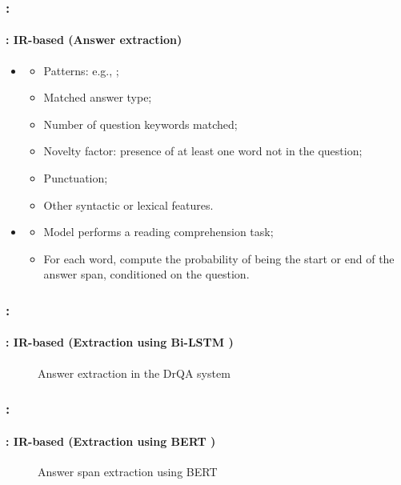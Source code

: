 \documentclass[xcolor=table]{beamer}
\begin{document}
\begin{frame}
	\frametitle{\insertshortsubtitle: \insertsection}
	\framesubtitle{\insertsubsection: IR-based (Answer extraction)}
	
	\begin{itemize}
		\item {}
		\begin{itemize}
			\item Patterns: e.g., ;
			\item Matched answer type;
			\item Number of question keywords matched;
			\item Novelty factor: presence of at least one word not in the question;
			\item Punctuation;
			\item Other syntactic or lexical features.
		\end{itemize}
		\item {}
		\begin{itemize}
			\item Model performs a reading comprehension task;
			\item For each word, compute the probability of being the start or end of the answer span, conditioned on the question.
		\end{itemize}
	\end{itemize}
	
\end{frame}

\begin{frame}
	\frametitle{\insertshortsubtitle: \insertsection}
	\framesubtitle{\insertsubsection: IR-based (Extraction using Bi-LSTM \cite{2017-chen-al})}
	
	\vskip-6pt
	\begin{figure}
		\vskip-3pt
		\caption{Answer extraction in the DrQA system \cite{2019-jurafsky-martin}}
	\end{figure}
	
\end{frame}

\begin{frame}
	\frametitle{\insertshortsubtitle: \insertsection}
	\framesubtitle{\insertsubsection: IR-based (Extraction using BERT \cite{2018-devlin-al})}
	
	\begin{figure}
		\centering
		\caption{Answer span extraction using BERT \cite{2019-jurafsky-martin}}
	\end{figure}
	
\end{frame}
\end{document}
